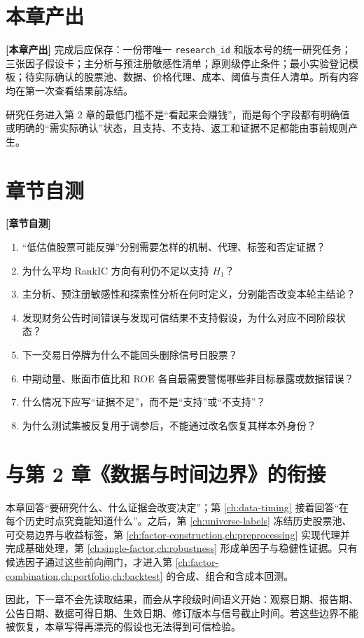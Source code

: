 \section{本章产出}

\begin{outputbox}
\textbf{[本章产出]} 完成后应保存：一份带唯一 \texttt{research\_id} 和版本号的统一研究任务；三张因子假设卡；主分析与预注册敏感性清单；原则级停止条件；最小实验登记模板；待实际确认的股票池、数据、价格代理、成本、阈值与责任人清单。所有内容均在第一次查看结果前冻结。
\end{outputbox}

研究任务进入第 2 章的最低门槛不是“看起来会赚钱”，而是每个字段都有明确值或明确的“需实际确认”状态，且支持、不支持、返工和证据不足都能由事前规则产生。

\section{章节自测}

\begin{quizbox}
\textbf{[章节自测]}
\begin{enumerate}
  \item “低估值股票可能反弹”分别需要怎样的机制、代理、标签和否定证据？
  \item 为什么平均 RankIC 方向有利仍不足以支持 \(H_1\)？
  \item 主分析、预注册敏感性和探索性分析在何时定义，分别能否改变本轮主结论？
  \item 发现财务公告时间错误与发现可信结果不支持假设，为什么对应不同阶段状态？
  \item 下一交易日停牌为什么不能回头删除信号日股票？
  \item 中期动量、账面市值比和 ROE 各自最需要警惕哪些非目标暴露或数据错误？
  \item 什么情况下应写“证据不足”，而不是“支持”或“不支持”？
  \item 为什么测试集被反复用于调参后，不能通过改名恢复其样本外身份？
\end{enumerate}
\end{quizbox}

\section{与第 2 章《数据与时间边界》的衔接}

本章回答“要研究什么、什么证据会改变决定”；第 \cref{ch:data-timing} 接着回答“在每个历史时点究竟能知道什么”。之后，第 \cref{ch:universe-labels} 冻结历史股票池、可交易边界与收益标签，第 \cref{ch:factor-construction,ch:preprocessing} 实现代理并完成基础处理，第 \cref{ch:single-factor,ch:robustness} 形成单因子与稳健性证据。只有候选因子通过这些前向闸门，才进入第 \cref{ch:factor-combination,ch:portfolio,ch:backtest} 的合成、组合和含成本回测。

因此，下一章不会先读取结果，而会从字段级时间语义开始：观察日期、报告期、公告日期、数据可得日期、生效日期、修订版本与信号截止时间。若这些边界不能被恢复，本章写得再漂亮的假设也无法得到可信检验。
